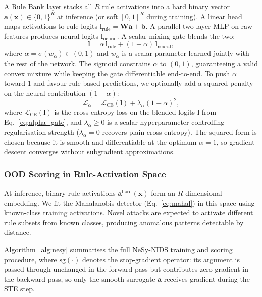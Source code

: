 \documentclass[conference]{IEEEtran}
\begin{document}
A Rule Bank layer stacks all $R$ rule activations into a hard binary
vector $\mathbf{a}(\mathbf{x})\in\{0,1\}^R$ at inference (or soft
$[0,1]^R$ during training). A linear head maps activations to rule
logits $\mathbf{l}_{\mathrm{rule}}{=}\mathbf{W}\mathbf{a}{+}\mathbf{b}$.
A parallel two-layer MLP on raw features produces neural logits
$\mathbf{l}_{\mathrm{neural}}$. A scalar mixing gate blends the two:
\begin{equation}
  \mathbf{l} = \alpha\,\mathbf{l}_{\mathrm{rule}} +
               (1{-}\alpha)\,\mathbf{l}_{\mathrm{neural}},
  \label{eq:alpha_gate}
\end{equation}
where $\alpha{=}\sigma(w_\alpha)\in(0,1)$ and $w_\alpha$ is a scalar
parameter learned jointly with the rest of the network. The sigmoid
constrains $\alpha$ to $(0,1)$, guaranteeing a valid convex mixture
while keeping the gate differentiable end-to-end.
To push $\alpha$ toward 1 and favour rule-based predictions, we
optionally add a squared penalty on the neural contribution $(1{-}\alpha)$:
\begin{equation}
  \mathcal{L}_\alpha = \mathcal{L}_{\mathrm{CE}}(\mathbf{l}) +
                       \lambda_\alpha(1{-}\alpha)^2,
  \label{eq:alpha_reg}
\end{equation}
where $\mathcal{L}_{\mathrm{CE}}(\mathbf{l})$ is the cross-entropy loss
on the blended logits $\mathbf{l}$ from Eq.~\ref{eq:alpha_gate}, and
$\lambda_\alpha{\geq}0$ is a scalar hyperparameter controlling
regularisation strength ($\lambda_\alpha{=}0$ recovers plain
cross-entropy). The squared form is chosen because it is smooth and
differentiable at the optimum $\alpha{=}1$, so gradient descent
converges without subgradient approximations.

\subsubsection{OOD Scoring in Rule-Activation Space}

At inference, binary rule activations $\mathbf{a}^{\mathrm{hard}}(\mathbf{x})$
form an $R$-dimensional embedding. We fit the Mahalanobis detector
(Eq.~\ref{eq:mahal}) in this space using known-class training
activations. Novel attacks are expected to activate different rule
subsets from known classes, producing anomalous patterns detectable by
distance.

Algorithm~\ref{alg:nesy} summarises the full NeSy-NIDS training and
scoring procedure, where $\mathrm{sg}(\cdot)$ denotes the stop-gradient
operator: its argument is passed through unchanged in the forward pass
but contributes zero gradient in the backward pass, so only the smooth
surrogate $\mathbf{a}$ receives gradient during the STE step.
\end{document}
